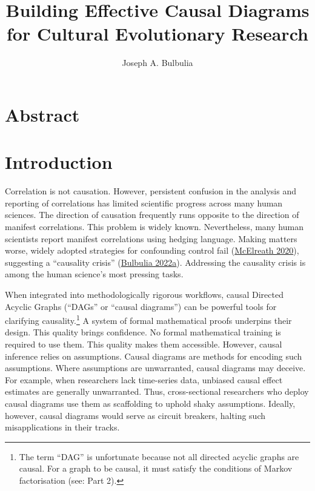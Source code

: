 \documentclass[
  singlecolumn]{report}
\title{Building Effective Causal Diagrams for Cultural Evolutionary
Research}
\author{Joseph A. Bulbulia}
\date{}
\begin{document}
\maketitle
\ifdefined\Shaded\renewenvironment{Shaded}{\begin{tcolorbox}[breakable, interior hidden, boxrule=0pt, borderline west={3pt}{0pt}{shadecolor}, sharp corners, enhanced, frame hidden]}{\end{tcolorbox}}\fi

\listoffigures
\listoftables
\hypertarget{abstract}{%
\section{Abstract}\label{abstract}}

\hypertarget{introduction}{%
\section{Introduction}\label{introduction}}

Correlation is not causation. However, persistent confusion in the
analysis and reporting of correlations has limited scientific progress
across many human sciences. The direction of causation frequently runs
opposite to the direction of manifest correlations. This problem is
widely known. Nevertheless, many human scientists report manifest
correlations using hedging language. Making matters worse, widely
adopted strategies for confounding control fail
(\protect\hyperlink{ref-mcelreath2020}{McElreath 2020}), suggesting a
``causality crisis'' (\protect\hyperlink{ref-bulbulia2022}{Bulbulia
2022a}). Addressing the causality crisis is among the human science's
most pressing tasks.

When integrated into methodologically rigorous workflows, causal
Directed Acyclic Graphs (``DAGs'' or ``causal diagrams'') can be
powerful tools for clarifying causality.\footnote{The term ``DAG'' is
  unfortunate because not all directed acyclic graphs are causal. For a
  graph to be causal, it must satisfy the conditions of Markov
  factorisation (see: Part 2).} A system of formal mathematical proofs
underpins their design. This quality brings confidence. No formal
mathematical training is required to use them. This quality makes them
accessible. However, causal inference relies on assumptions. Causal
diagrams are methods for encoding such assumptions. Where assumptions
are unwarranted, causal diagrams may deceive. For example, when
researchers lack time-series data, unbiased causal effect estimates are
generally unwarranted. Thus, cross-sectional researchers who deploy
causal diagrams use them as scaffolding to uphold shaky assumptions.
Ideally, however, causal diagrams would serve as circuit breakers,
halting such misapplications in their tracks.
\end{document}
